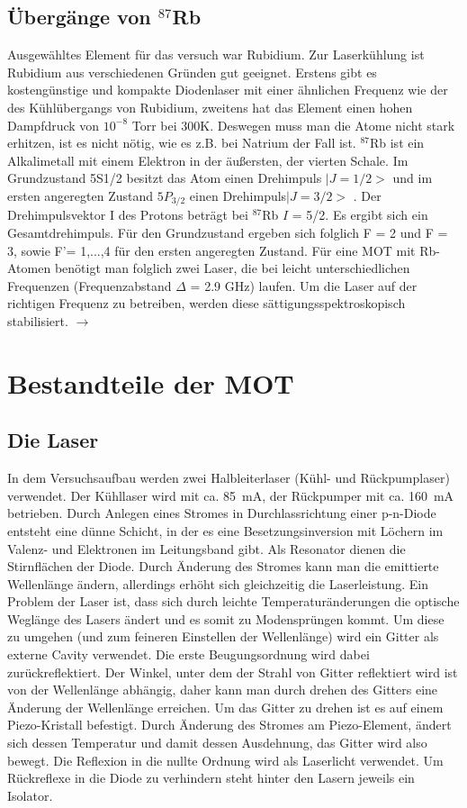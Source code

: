 \documentclass[12pt,a4paper]{article}
\begin{document}
  \subsection{Übergänge von ${}^{87}$Rb}
  Ausgewähltes Element für das versuch war Rubidium. Zur Laserkühlung ist Rubidium aus verschiedenen Gründen gut geeignet. Erstens gibt es kostengünstige und kompakte Diodenlaser mit einer ähnlichen Frequenz wie der des Kühlübergangs von Rubidium, zweitens hat das Element einen hohen Dampfdruck von ${10^{-8}}$ Torr bei 300K. Deswegen muss man die Atome nicht stark erhitzen, ist es nicht nötig, wie es z.B. bei Natrium der Fall ist.
${}^{87}$Rb ist ein Alkalimetall mit einem Elektron in der äußersten, der vierten Schale. Im Grundzustand 5S1/2 besitzt das Atom einen Drehimpuls
   ${|J = 1/2>}$ und im ersten angeregten Zustand $5P_{3/2}$ einen Drehimpuls${ |J = 3/2>}$ . Der Drehimpulsvektor I des Protons beträgt bei ${}^{87}$Rb $I$ = 5/2. Es ergibt sich ein Gesamtdrehimpuls. Für den Grundzustand ergeben sich folglich F = 2 und F = 3, sowie F'= 1,...,4 für den ersten angeregten Zustand.
Für eine MOT mit Rb-Atomen benötigt man folglich zwei Laser, die bei leicht unterschiedlichen Frequenzen (Frequenzabstand ${\Delta}$ = 2.9 GHz) laufen. Um die Laser auf der richtigen Frequenz zu betreiben, werden diese sättigungsspektroskopisch stabilisiert. $\rightarrow$
\section{Bestandteile der MOT}
  \subsection{Die Laser}
    In dem Versuchsaufbau werden zwei Halbleiterlaser (Kühl- und Rückpumplaser)
    verwendet. Der Kühllaser wird mit ca. \SI{85}{\mA}, der Rückpumper mit ca.
    \SI{160}{\mA} betrieben. Durch Anlegen eines Stromes in Durchlassrichtung
    einer p-n-Diode entsteht eine dünne Schicht, in der es eine Besetzungsinversion
    mit Löchern im Valenz- und Elektronen im Leitungsband gibt. Als Resonator
    dienen die Stirnflächen der Diode. Durch Änderung des Stromes kann man die
    emittierte Wellenlänge ändern, allerdings erhöht sich gleichzeitig die
    Laserleistung. Ein Problem der Laser ist, dass sich durch leichte
    Temperaturänderungen die optische Weglänge des Lasers ändert und es somit zu
    Modensprüngen kommt. Um diese zu umgehen (und zum feineren Einstellen der
    Wellenlänge) wird ein Gitter als externe Cavity verwendet. Die erste
    Beugungsordnung wird dabei zurückreflektiert. Der Winkel, unter dem der Strahl
    von Gitter reflektiert wird ist von der Wellenlänge abhängig, daher kann man
    durch drehen des Gitters eine Änderung der Wellenlänge erreichen. Um das Gitter
    zu drehen ist es auf einem Piezo-Kristall befestigt. Durch Änderung des Stromes
    am Piezo-Element, ändert sich dessen Temperatur und damit dessen Ausdehnung, das
    Gitter wird also bewegt. Die Reflexion in die nullte Ordnung wird als Laserlicht
    verwendet. Um Rückreflexe in die Diode zu verhindern steht hinter den Lasern
    jeweils ein Isolator.
\end{document}
